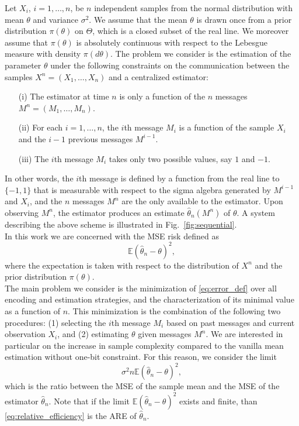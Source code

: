 \documentclass[letterpaper, conference]{IEEEtran}      %
\begin{document}
Let $X_i$, $i=1,\ldots,n$, be $n$ independent samples from the normal distribution with mean $\theta$ and variance $\sigma^2$. 
We assume that the mean $\theta$ is drawn once from a prior distribution $\pi(\theta)$ on $\Theta$, which is a closed subset of the real line. We moreover assume that $\pi(\theta)$ is absolutely continuous with respect to the Lebesgue measure with density $\pi(d\theta)$. The problem we consider is the estimation of the parameter $\theta$ under the following constraints on the communication between the samples $X^n = (X_1,\ldots,X_n)$ and a centralized estimator: 
\begin{itemize}
\item[(i)] The estimator at time $n$ is only a function of the $n$ messages $M^n = \left(M_1,\ldots,M_n \right)$.
\item[(ii)] For each $i=1,\ldots,n$, the $i$th message $M_i$ is a function of the sample $X_i$ and the $i-1$ previous messages $M^{i-1}$.
\item[(iii)] The $i$th message $M_i$ takes only two possible values, say $1$ and $-1$. 
\end{itemize}
In other words, the $i$th message is defined by a function from the real line to $\{-1,1\}$ that is measurable with respect to the sigma algebra generated by $M^{i-1}$ and $X_i$, and the $n$ messages $M^n$ are the only available to the estimator. Upon observing $M^n$, the estimator produces an estimate $\widehat{\theta}_n(M^n)$ of $\theta$. A system describing the above scheme is illustrated in Fig.~\ref{fig:sequential}. \\

In this work we are concerned with the MSE risk defined as
\begin{equation}
\label{eq:error_def}
\mathbb E\left(\widehat{\theta}_n - \theta \right)^2,
\end{equation}
where the expectation is taken with respect to the distribution of $X^n$ and the prior distribution $\pi(\theta)$. \\

The main problem we consider is the minimization of \eqref{eq:error_def} over all encoding and estimation strategies, and the characterization of its minimal value as a function of $n$. This minimization is the combination of the following two procedures: (1) selecting the $i$th message $M_i$ based on past messages and current observation $X_i$, and (2) estimating $\theta$ given messages $M^n$. 
%
We are interested in particular on the increase in sample complexity compared to the vanilla mean estimation without one-bit constraint. For this reason, we consider the limit
\begin{equation}
{\sigma^2} n \mathbb E\left(\widehat{\theta}_n - \theta \right)^2,
\label{eq:relative_efficiency}
\end{equation}
which is the ratio between the MSE of the sample mean and the MSE of the estimator $\widehat{\theta}_n$. Note that if the limit $\mathbb E\left(\widehat{\theta}_{n} - \theta \right)^2$ exists and finite, than \eqref{eq:relative_efficiency} is the ARE of $\widehat{\theta}_n$. 
\end{document}

